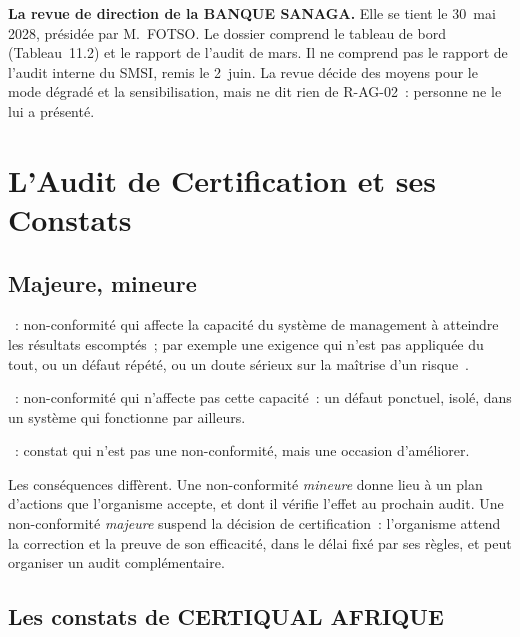 \begin{boxinfo}
\textbf{La revue de direction de la BANQUE SANAGA.} Elle se tient le
30~mai 2028, présidée par M.~FOTSO. Le dossier comprend le tableau de bord
(Tableau~11.2) et le rapport de l'audit de mars. Il ne comprend pas le
rapport de l'audit interne du SMSI, remis le 2~juin. La revue décide des
moyens pour le mode dégradé et la sensibilisation, mais ne dit rien de
R-AG-02~: personne ne le lui a présenté.
\end{boxinfo}

\section{L'Audit de Certification et ses Constats}
\label{sec:c11-certification}

\subsection{Majeure, mineure}

\begin{boxdef}
~:
non-conformité qui affecte la capacité du système de management à
atteindre les résultats escomptés~; par exemple une exigence qui n'est pas
appliquée du tout, ou un défaut répété, ou un doute sérieux sur la
maîtrise d'un risque~\cite{iso17021_2015}.

\medskip
{}~:
non-conformité qui n'affecte pas cette capacité~: un défaut ponctuel, isolé,
dans un système qui fonctionne par ailleurs.

\medskip
{}~: constat qui n'est pas
une non-conformité, mais une occasion d'améliorer.
\end{boxdef}

Les conséquences diffèrent. Une non-conformité \emph{mineure} donne lieu à
un plan d'actions que l'organisme accepte, et dont il vérifie l'effet au
prochain audit. Une non-conformité \emph{majeure} suspend la décision de
certification~: l'organisme attend la correction et la preuve de son
efficacité, dans le délai fixé par ses règles, et peut organiser un audit
complémentaire.

\subsection{Les constats de CERTIQUAL AFRIQUE}

